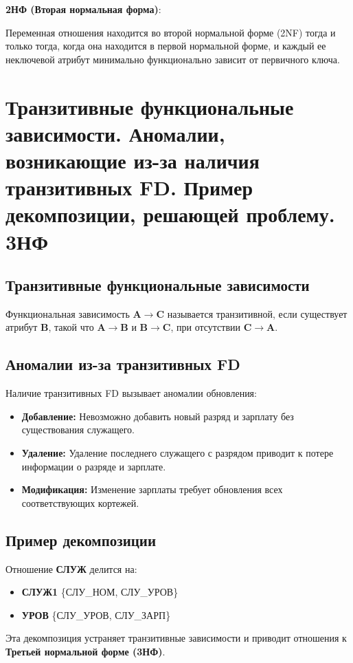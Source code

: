 \documentclass[a4paper,12pt]{article}
\begin{document}
\textbf{2НФ (Вторая нормальная форма)}:

Переменная отношения находится во второй нормальной форме (2NF) тогда и только тогда, когда она находится в первой нормальной форме, и каждый ее неключевой атрибут минимально функционально зависит от первичного ключа.

\section{Транзитивные функциональные зависимости. Аномалии, возникающие из-за наличия транзитивных FD. Пример декомпозиции, решающей проблему. 3НФ}

\subsection{Транзитивные функциональные зависимости}

Функциональная зависимость \(\mathbf{A \rightarrow C}\) называется транзитивной, если существует атрибут \textbf{B}, такой что \(\mathbf{A \rightarrow B}\) и \(\mathbf{B \rightarrow C}\), при отсутствии \(\mathbf{C \rightarrow A}\).

\subsection{Аномалии из-за транзитивных FD}

Наличие транзитивных FD вызывает аномалии обновления:
\begin{itemize}
    \item \textbf{Добавление:} Невозможно добавить новый разряд и зарплату без существования служащего.
    \item \textbf{Удаление:} Удаление последнего служащего с разрядом приводит к потере информации о разряде и зарплате.
    \item \textbf{Модификация:} Изменение зарплаты требует обновления всех соответствующих кортежей.
\end{itemize}

\subsection{Пример декомпозиции}

Отношение \textbf{СЛУЖ} делится на:
\begin{itemize}
    \item \textbf{СЛУЖ1} \{СЛУ\_НОМ, СЛУ\_УРОВ\}
    \item \textbf{УРОВ} \{СЛУ\_УРОВ, СЛУ\_ЗАРП\}
\end{itemize}
Эта декомпозиция устраняет транзитивные зависимости и приводит отношения к \textbf{Третьей нормальной форме (3НФ)}.
\end{document}
